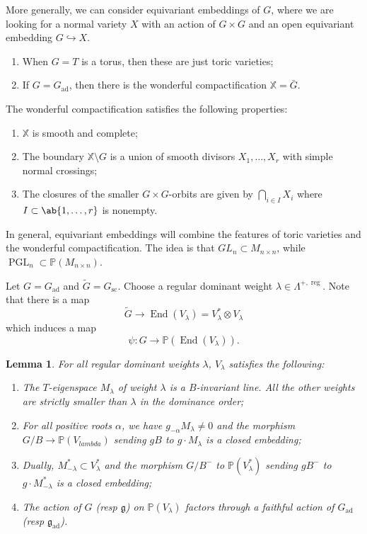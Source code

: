 \documentclass{amsart}
\newtheorem{lem}[thm]{Lemma}
\theoremstyle{definition}
\theoremstyle{remark}
\theoremstyle{plain}
\theoremstyle{definition}
\theoremstyle{remark}
\renewcommand{\P}{\mathbb{P}}
\newcommand{\g}{\mathfrak{g}}
\newcommand{\mbb}[1]{\mathbb{#1}}
\newcommand{\on}[1]{\operatorname{#1}}
\newcommand{\1}{\mathbf{1}}
\newcommand{\2}{\mathbf{2}}
\newcommand{\3}{\mathbf{3}}
\DeclareMathOperator{\End}{End}
\DeclareMathOperator{\ad}{ad}
\begin{document}
More generally, we can consider equivariant embeddings of \(G\), where we are looking for a normal variety \(X\) with an action of \(G \times G\) and an open equivariant embedding \(G \hookrightarrow X\). 
\begin{enumerate}
    \item When \(G = T\) is a torus, then these are just toric varieties;
    \item If \(G = G_{\on{ad}}\), then there is the wonderful compactification \(\mbb{X} = \bar{G}\).
\end{enumerate}
The wonderful compactification satisfies the following properties:
\begin{enumerate}
    \item \(\mbb{X}\) is smooth and complete;
    \item The boundary \(\mbb{X} \setminus G\) is a union of smooth divisors \(X_1, \ldots, X_r\) with simple normal crossings;
    \item The closures of the smaller \(G \times G\)-orbits are given by \(\bigcap_{i \in I} X_i\) where \(I \subset \ab\{ 1, \ldots, r\}\) is nonempty.
\end{enumerate}
In general, equivariant embeddings will combine the features of toric varieties and the wonderful compactification. The idea is that \(GL_n \subset M_{n \times n}\), while \(\on{PGL}_n \subset \P(M_{n \times n})\).

Let \(G = G_{\ad}\) and \(\tilde{G} = G_{\on{sc}}\). Choose a regular dominant weight \(\lambda \in \Lambda^{+, \on{reg}}\). Note that there is a map
\[ \tilde{G} \to \End(V_{\lambda}) = V_{\lambda}^* \otimes V_{\lambda} \]
which induces a map
\[ \psi \colon G \to \P(\End(V_{\lambda})). \]
\begin{lem}
    For all regular dominant weights \(\lambda\), \(V_{\lambda}\) satisfies the following:
    \begin{enumerate}
        \item The \(T\)-eigenspace \(M_{\lambda}\) of weight \(\lambda\) is a \(B\)-invariant line. All the other weights are strictly smaller than \(\lambda\) in the dominance order;
        \item For all positive roots \(\alpha\), we have \(g_{-\alpha} M_{\lambda} \neq 0\) and the morphism \(G/B \to \P(V_{lambda})\) sending \(gB\) to \(g \cdot M_{\lambda}\) is a closed embedding;
        \item Dually, \(M_{-\lambda}^* \subset V_{\lambda}^*\) and the morphism \(G/B^-\) to \(\P(V_{\lambda}^*)\) sending \(gB^-\) to \(g \cdot M_{-\lambda}^*\) is a closed embedding;
        \item The action of \(G\) (resp \(\g\)) on \(\P(V_{\lambda})\) factors through a faithful action of \(G_{\ad}\) (resp \(\g_{\ad}\)).
    \end{enumerate}
\end{lem}
\end{document}
